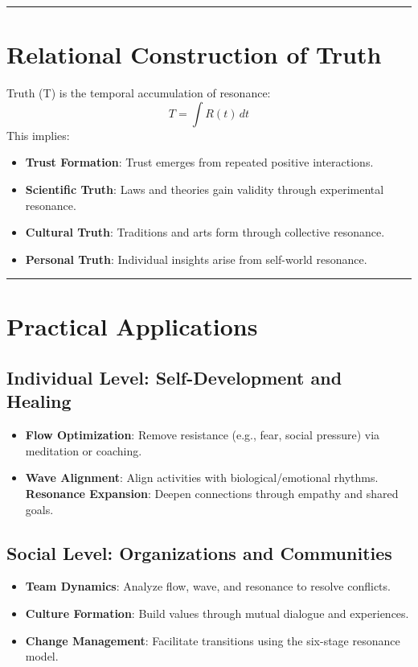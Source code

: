\documentclass{article}
\begin{document}
\hrule

\section{Relational Construction of Truth}
Truth (T) is the temporal accumulation of resonance:
$$
T = \int R(t) \, dt
$$
This implies:
\begin{itemize}
    \item \textbf{Trust Formation}: Trust emerges from repeated positive interactions.
    \item \textbf{Scientific Truth}: Laws and theories gain validity through experimental resonance.
    \item \textbf{Cultural Truth}: Traditions and arts form through collective resonance.
    \item \textbf{Personal Truth}: Individual insights arise from self-world resonance.
\end{itemize}

\hrule

\section{Practical Applications}

\subsection{Individual Level: Self-Development and Healing}
\begin{itemize}
    \item \textbf{Flow Optimization}: Remove resistance (e.g., fear, social pressure) via meditation or coaching.
    \item \textbf{Wave Alignment}: Align activities with biological/emotional rhythms.
    \textbf{Resonance Expansion}: Deepen connections through empathy and shared goals.
\end{itemize}

\subsection{Social Level: Organizations and Communities}
\begin{itemize}
    \item \textbf{Team Dynamics}: Analyze flow, wave, and resonance to resolve conflicts.
    \item \textbf{Culture Formation}: Build values through mutual dialogue and experiences.
    \item \textbf{Change Management}: Facilitate transitions using the six-stage resonance model.
\end{itemize}
\end{document}
